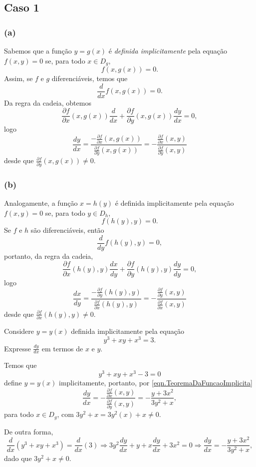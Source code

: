 \subsection{Caso 1}
    \subsubsection{(a)} Sabemos que a função \(y = g(x)\)  é \textit{definida implicitamente} pela equação \(f(x,y) = 0\) se, para todo \(x\in D_g\), \[f(x,g(x)) = 0.\] Assim, se \(f\) e \(g\) diferenciáveis, temos que \[\frac{d}{dx} f(x,g(x)) = 0.\] Da regra da cadeia, obtemos \[\frac{\partial f}{\partial x}(x,g(x)) \frac{d}{dx} + \frac{\partial f}{\partial y} (x,g(x)) \frac{dy}{dx} = 0,\] logo
        \begin{equation}\label{eqn.TeoremaDaFuncaoImplicita}
            \frac{dy}{dx} = \frac{-\frac{\partial f}{\partial x}(x,g(x))}{\frac{\partial f}{\partial y}(x,g(x))} = - \frac{\frac{\partial f}{\partial x}(x,y)}{\frac{\partial f}{\partial y}(x,y)} 
        \end{equation}
    desde que \(\frac{\partial f}{\partial y}(x,g(x)) \neq 0\).

    \subsubsection{(b)} Analogamente, a função \(x = h(y)\) é definida implicitamente pela equação \(f(x,y) = 0\) se, para todo \(y\in D_h\), \[f(h(y),y) = 0.\] Se \(f\) e \(h\) são diferenciáveis, então \[\frac{d}{dy} f(h(y),y) = 0,\] portanto, da regra da cadeia, \[\frac{\partial f}{\partial x}(h(y),y) \frac{dx}{dy} + \frac{\partial f}{\partial y}(h(y),y)\frac{dy}{dy} = 0,\] logo
        \begin{equation}\label{eqn.TeoremaDaFuncaImplicita1}
            \frac{dx}{dy} = \frac{-\frac{\partial f}{\partial y}(h(y),y)}{\frac{\partial f}{\partial x}(h(y),y)} = - \frac{\frac{\partial f}{\partial y}(x,y)}{\frac{\partial f}{\partial x}(x,y)}
        \end{equation}
    desde que \(\frac{\partial f}{\partial x}(h(y),y) \neq 0\).

\begin{example}
    Considere \(y = y(x)\) definida implicitamente pela equação \[y^3 + xy + x^3 = 3.\] Expresse \(\frac{dy}{dx}\) em termos de \(x\) e \(y\).

    Temos que \[y^3 + xy + x^3 - 3 = 0\] define \(y = y(x)\) implicitamente, portanto, por \eqref{eqn.TeoremaDaFuncaoImplicita} \[\frac{dy}{dx} = -\frac{\frac{\partial f}{\partial x}(x,y)}{\frac{\partial f}{\partial y}(x,y)} = - \frac{y+3x^2}{3y^2 + x},\] para todo \(x\in D_g\), com \(3y^2 + x = 3y^2(x) + x \neq 0\).

    De outra forma, \[\frac{d}{dx}(y^3 + xy + x^3) = \frac{d}{dx}(3) \Rightarrow 3y^2 \frac{dy}{dx} + y + x \frac{dy}{dx} + 3x^2 = 0 \Rightarrow \frac{dy}{dx} = - \frac{y+3x^2}{3y^2 + x},\] dado que \(3y^2 + x \neq 0\).
\end{example}

